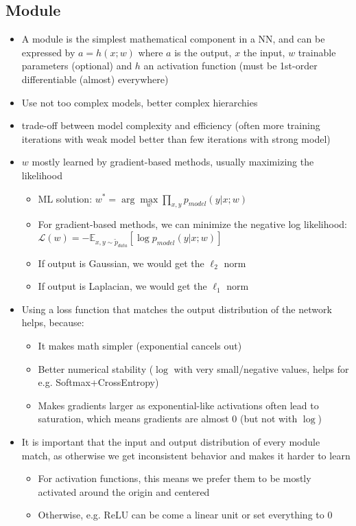 \subsection{Module}
\begin{itemize}
	\item A module is the simplest mathematical component in a NN, and can be expressed by $a=h(x;w)$ where $a$ is the output, $x$ the input, $w$ trainable parameters (optional) and $h$ an activation function (must be 1st-order differentiable (almost) everywhere)
	\item Use not too complex models, better complex hierarchies
	\item trade-off between model complexity and efficiency (often more training iterations with weak model better than few iterations with strong model)
	\item $w$ mostly learned by gradient-based methods, usually maximizing the likelihood
	\begin{itemize}
		\item ML solution: $w^{*} = \arg\max\limits_{w}\prod\limits_{x,y}p_{model}\left(y|x;w\right)$
		\item For gradient-based methods, we can minimize the negative log likelihood:\\ $\mathcal{L}(w) = -\mathbb{E}_{x,y\sim \tilde{p}_{data}}\left[\log p_{model}\left(y|x;w\right)\right]$
		\item If output is Gaussian, we would get the $\ell_2$ norm
		\item If output is Laplacian, we would get the $\ell_1$ norm
	\end{itemize} 
	\item Using a loss function that matches the output distribution of the network helps, because:
	\begin{itemize}
		\item It makes math simpler (exponential cancels out)
		\item Better numerical stability ($\log$ with very small/negative values, helps for e.g. Softmax+CrossEntropy)
		\item Makes gradients larger as exponential-like activations often lead to saturation, which means gradients are almost 0 (but not with $\log$)
	\end{itemize}
	\item It is important that the input and output distribution of every module match, as otherwise we get inconsistent behavior and makes it harder to learn
	\begin{itemize}
		\item For activation functions, this means we prefer them to be mostly activated around the origin and centered
		\item Otherwise, e.g. ReLU can be come a linear unit or set everything to 0
	\end{itemize}
\end{itemize}
